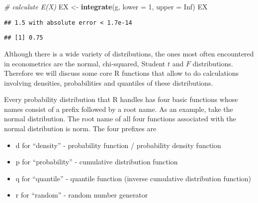 \documentclass[]{book}
\newenvironment{Shaded}{\begin{snugshade}}{\end{snugshade}}
\newcommand{\KeywordTok}[1]{\textcolor[rgb]{0.13,0.29,0.53}{\textbf{#1}}}
\newcommand{\DataTypeTok}[1]{\textcolor[rgb]{0.13,0.29,0.53}{#1}}
\newcommand{\DecValTok}[1]{\textcolor[rgb]{0.00,0.00,0.81}{#1}}
\newcommand{\StringTok}[1]{\textcolor[rgb]{0.31,0.60,0.02}{#1}}
\newcommand{\CommentTok}[1]{\textcolor[rgb]{0.56,0.35,0.01}{\textit{#1}}}
\newcommand{\OtherTok}[1]{\textcolor[rgb]{0.56,0.35,0.01}{#1}}
\newcommand{\OperatorTok}[1]{\textcolor[rgb]{0.81,0.36,0.00}{\textbf{#1}}}
\newcommand{\NormalTok}[1]{#1}
\providecommand{\tightlist}{%
  \setlength{\itemsep}{0pt}\setlength{\parskip}{0pt}}
\theoremstyle{definition}
\theoremstyle{definition}
\theoremstyle{definition}
\theoremstyle{remark}
\begin{document}
\begin{Shaded}
\begin{Highlighting}[]
\CommentTok{# calculate E(X)}
\NormalTok{EX <-}\StringTok{ }\KeywordTok{integrate}\NormalTok{(g,}
                \DataTypeTok{lower =} \DecValTok{1}\NormalTok{,}
                \DataTypeTok{upper =} \OtherTok{Inf}\NormalTok{)}
\NormalTok{EX}
\end{Highlighting}
\end{Shaded}

\begin{verbatim}
## 1.5 with absolute error < 1.7e-14
\end{verbatim}

\begin{Shaded}
\end{Shaded}

\begin{verbatim}
## [1] 0.75
\end{verbatim}

Although there is a wide variety of distributions, the ones most often
encountered in econometrics are the normal, chi-squared, Student \(t\)
and \(F\) distributions. Therefore we will discuss some core R functions
that allow to do calculations involving densities, probabilities and
quantiles of these distributions.

Every probability distribution that R handles has four basic functions
whose names consist of a prefix followed by a root name. As an example,
take the normal distribution. The root name of all four functions
associated with the normal distribution is norm. The four prefixes are

\begin{itemize}
\tightlist
\item
  d for ``density'' - probability function / probability density
  function
\item
  p for ``probability'' - cumulative distribution function
\item
  q for ``quantile'' - quantile function (inverse cumulative
  distribution function)
\item
  r for ``random'' - random number generator
\end{itemize}
\end{document}
